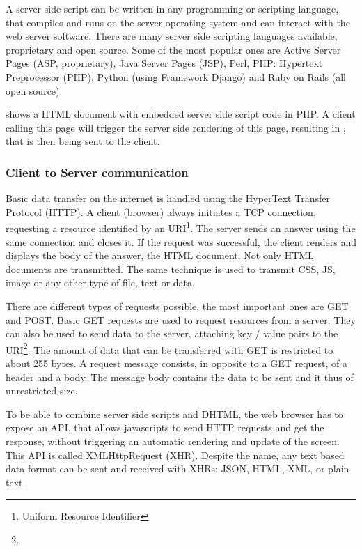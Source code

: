 A server side script can be written in any programming or scripting language, that compiles and runs on the server operating system and can interact with the web server software.
There are many server side scripting languages available, proprietary and open source.
Some of the most popular ones are Active Server Pages (ASP, proprietary), Java Server Pages (JSP), Perl, PHP: Hypertext Preprocessor (PHP), Python (using Framework Django) and Ruby on Rails (all open source).

 shows a HTML document with embedded server side script code in PHP.
A client calling this page will trigger the server side rendering of this page, resulting in , that is then being sent to the client.



\subsubsection{Client to Server communication}
\label{sec:servercom}

Basic data transfer on the internet is handled using the HyperText Transfer Protocol (HTTP).
A client (browser) always initiates a TCP connection, requesting a resource identified by an URI\footnote{Uniform Resource Identifier}.
The server sends an answer using the same connection and closes it.
If the request was successful, the client renders and displays the body of the answer, the HTML document. Not only HTML documents are transmitted. The same technique is used to transmit CSS, JS, image or any other type of file, text or data.

There are different types of requests possible, the most important ones are GET and POST.
Basic GET requests are used to request resources from a server.
They can also be used to send data to the server, attaching key / value pairs to the URI\footnote{}. The amount of data that can be transferred with GET is restricted to about 255 bytes.
A  request message consists, in opposite to a GET request, of a header and a body.
The message body contains the data to be sent and it thus of unrestricted size.

To be able to combine server side scripts and DHTML, the web browser has to expose an API, that allows javascripts to send HTTP requests and get the response, without triggering an automatic rendering and update of the screen.
This API is called XMLHttpRequest (XHR). Despite the name, any text based data format can be sent and received with XHRs: JSON, HTML, XML, or plain text.

